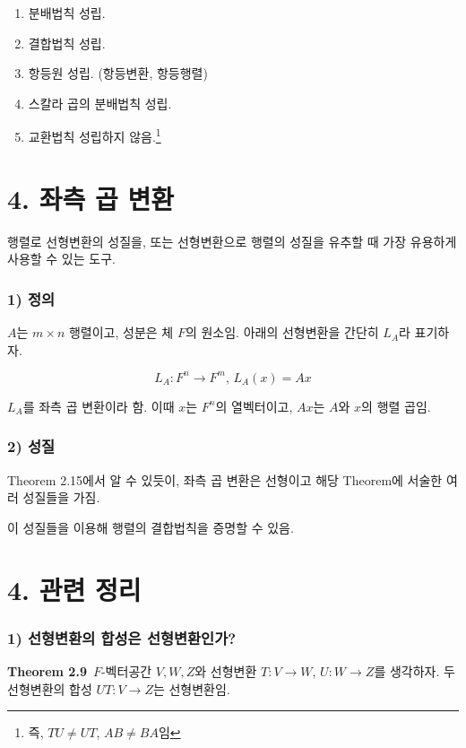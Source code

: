 \begin{enumerate}
    \item 분배법칙 성립.
    \item 결합법칙 성립.
    \item 항등원 성립. (항등변환, 항등행렬)
    \item 스칼라 곱의 분배법칙 성립.
    \item 교환법칙 성립하지 않음.\footnote{즉, $TU \neq UT$, $AB \neq BA$임}\\
\end{enumerate}


\section*{4. 좌측 곱 변환}

행렬로 선형변환의 성질을, 또는 선형변환으로 행렬의 성질을 유추할 때 가장 유용하게 사용할 수 있는 도구.

\subsubsection*{1) 정의\\}
\begin{DEF}
$A$는 $m \times n$ 행렬이고, 성분은 체 $F$의 원소임. 아래의 선형변환을 간단히 $L_A$라 표기하자.

\[
L_A:F^n \rightarrow F^m,\, L_A(x)=Ax
\]

$L_A$를 좌측 곱 변환이라 함. 이때 $x$는 $F^n$의 열벡터이고, $Ax$는 $A$와 $x$의 행렬 곱임.
\end{DEF}

\subsubsection*{2) 성질}
Theorem 2.15에서 알 수 있듯이, 좌측 곱 변환은 선형이고 해당 Theorem에 서술한 여러 성질들을 가짐.

이 성질들을 이용해 행렬의 결합법칙을 증명할 수 있음.


\newpage


\section*{4. 관련 정리}

\subsubsection*{1) 선형변환의 합성은 선형변환인가?}
\textbf{Theorem 2.9}\, $F$-벡터공간 $V,W,Z$와 선형변환 $T:V \rightarrow W$, $U:W \rightarrow Z$를 생각하자. 두 선형변환의 합성 $UT:V \rightarrow Z$는 선형변환임.

